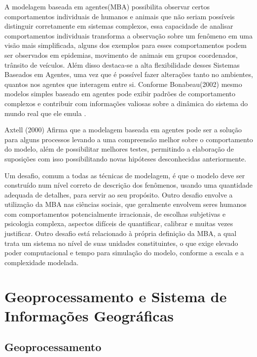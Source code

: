 A modelagem baseada em agentes(MBA) possibilita observar certos comportamentos individuais de humanos e animais que não seriam possíveis distinguir corretamente em sistemas complexos, essa capacidade de analisar comportamentos individuais transforma a observação sobre um fenômeno em uma visão mais simplificada, alguns dos exemplos para esses comportamentos podem ser observados em epidemias, movimento de animais em grupos coordenados, trânsito de veículos. Além disso destaca-se a alta flexibilidade desses Sistemas Baseados em Agentes, uma vez que é possível fazer alterações tanto no ambientes, quantos nos agentes que interagem entre si. Conforme Bonabeau(2002) mesmo modelos simples baseado em agentes pode exibir padrões de comportamento complexos e contribuir com informações valiosas sobre a dinâmica do sistema do mundo real que ele emula \cite{bonabeau2002agent}.

Axtell (2000) Afirma que a modelagem baseada em agentes pode ser a solução para alguns processos levando a uma compreensão melhor sobre o comportamento do modelo, além de possibilitar melhores testes, permitindo a elaboração de suposições com isso possibilitando novas hipóteses desconhecidas anteriormente.\cite{Axtell:online}

Um desafio, comum a todas as técnicas de modelagem, é que o modelo deve ser construído num nível correto de descrição dos fenômenos, usando uma quantidade adequada de detalhes, para servir ao seu propósito. Outro desafio envolve a utilização da MBA nas ciências sociais, que geralmente envolvem seres humanos com comportamentos potencialmente irracionais, de escolhas subjetivas e psicologia complexa, aspectos difíceis de quantificar, calibrar e muitas vezes justificar. Outro desafio está relacionado à própria definição da MBA, a qual trata um sistema no nível de suas unidades constituintes, o que exige elevado poder computacional e tempo para simulação do modelo, conforme a escala e a complexidade modelada.


\section{Geoprocessamento e Sistema de Informações Geográficas}

\subsection{Geoprocessamento}


